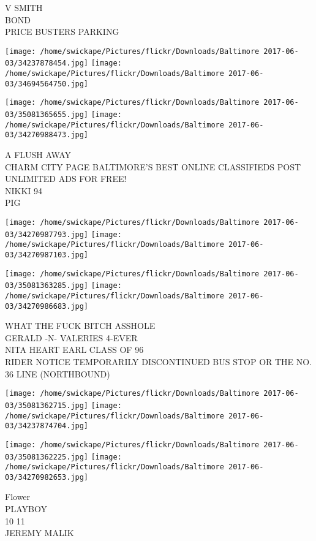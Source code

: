 \documentclass[10pt,letterpaper]{article}
\begin{document}
V SMITH\\
BOND\\
PRICE BUSTERS PARKING\\
\pagebreak

\texttt{[image: /home/swickape/Pictures/flickr/Downloads/Baltimore 2017-06-03/34237878454.jpg]}
\texttt{[image: /home/swickape/Pictures/flickr/Downloads/Baltimore 2017-06-03/34694564750.jpg]}

\texttt{[image: /home/swickape/Pictures/flickr/Downloads/Baltimore 2017-06-03/35081365655.jpg]}
\texttt{[image: /home/swickape/Pictures/flickr/Downloads/Baltimore 2017-06-03/34270988473.jpg]}

A FLUSH AWAY\\
CHARM CITY PAGE BALTIMORE'S BEST ONLINE CLASSIFIEDS POST UNLIMITED ADS FOR FREE!\\
NIKKI 94\\
PIG\\
\pagebreak

\texttt{[image: /home/swickape/Pictures/flickr/Downloads/Baltimore 2017-06-03/34270987793.jpg]}
\texttt{[image: /home/swickape/Pictures/flickr/Downloads/Baltimore 2017-06-03/34270987103.jpg]}

\texttt{[image: /home/swickape/Pictures/flickr/Downloads/Baltimore 2017-06-03/35081363285.jpg]}
\texttt{[image: /home/swickape/Pictures/flickr/Downloads/Baltimore 2017-06-03/34270986683.jpg]}

WHAT THE FUCK BITCH ASSHOLE\\
GERALD {-}N{-} VALERIES 4{-}EVER\\
NITA HEART EARL CLASS OF 96\\
RIDER NOTICE TEMPORARILY DISCONTINUED BUS STOP OR THE NO. 36 LINE (NORTHBOUND)\\
\pagebreak

\texttt{[image: /home/swickape/Pictures/flickr/Downloads/Baltimore 2017-06-03/35081362715.jpg]}
\texttt{[image: /home/swickape/Pictures/flickr/Downloads/Baltimore 2017-06-03/34237874704.jpg]}

\texttt{[image: /home/swickape/Pictures/flickr/Downloads/Baltimore 2017-06-03/35081362225.jpg]}
\texttt{[image: /home/swickape/Pictures/flickr/Downloads/Baltimore 2017-06-03/34270982653.jpg]}

Flower\\
PLAYBOY\\
10 11\\
JEREMY MALIK\\
\pagebreak
\end{document}
